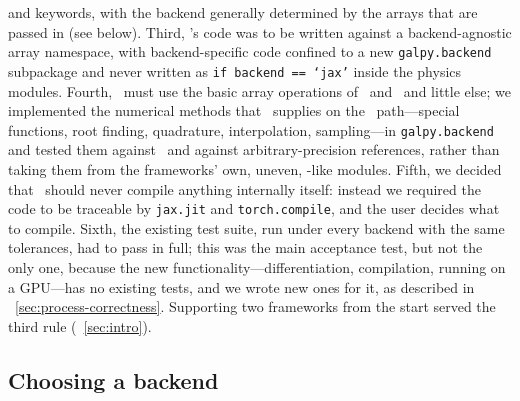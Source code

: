 and keywords, with the backend generally determined by the arrays that are passed
in (see below). Third, \galpy's code was to be written against a backend-agnostic array
namespace, with backend-specific code confined to a new \texttt{galpy.backend}
subpackage and never written as \texttt{if backend == `jax'} inside the
physics modules. Fourth, \galpy\ must use the basic array operations of \jax\ and
\torch\ and little else; we implemented the numerical methods that
\scipy\ supplies on the \numpy\ path---special functions, root finding,
quadrature, interpolation, sampling---in \texttt{galpy.backend} and
tested them against \scipy\ and against arbitrary-precision references,
rather than taking them from the frameworks' own, uneven, \scipy-like
modules. Fifth, we decided that \galpy\ should never compile anything internally itself: 
instead we required the code
to be traceable by \texttt{jax.jit} and \texttt{torch.compile}, and the
user decides what to compile. Sixth, the existing test suite, run
under every backend with the same tolerances, had to pass in full;
this was the main acceptance test, but not the only one, because the
new functionality---differentiation, compilation, running on a
GPU---has no existing tests, and we wrote new ones for it, as
described in \sectionname~\ref{sec:process-correctness}. Supporting
two frameworks from the start served the third rule
(\sectionname~\ref{sec:intro}).

\subsection{Choosing a backend}\label{sec:design-choosing}

